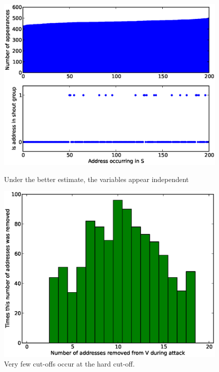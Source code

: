 \documentclass[ %
                    author={Luke Murray},
                supervisor={Dr. Simon Hollis},
                     title={Shadow Peer-to-Peer Networks},
                  subtitle={},
                    degree={MEng},
                      year={2013} ]{thesis}
\begin{document}
\begin{figure}[h]
    \centering
    \begin{minipage}[b]{0.4\linewidth}
        \centering
        \includegraphics[width=\linewidth]{diagrams/better1.eps}
        \caption{Under the better estimate, the variables appear independent}
        \label{threshold_attack_better1}
    \end{minipage}
    \hspace{0.5cm}
    \begin{minipage}[b]{0.4\linewidth}
        \centering
        \includegraphics[width=\linewidth]{diagrams/better2.eps}
        \caption{Very few cut-offs occur at the hard cut-off.}
        \label{threshold_attack_better2}
    \end{minipage}
\end{figure}
\end{document}
